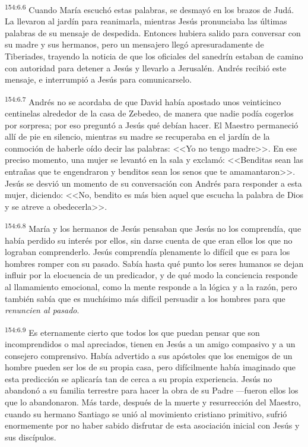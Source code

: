 \par 
\textsuperscript{154:6.6} Cuando María escuchó estas palabras, se desmayó en los brazos de Judá. La llevaron al jardín para reanimarla, mientras Jesús pronunciaba las últimas palabras de su mensaje de despedida. Entonces hubiera salido para conversar con su madre y sus hermanos, pero un mensajero llegó apresuradamente de Tiberiades, trayendo la noticia de que los oficiales del sanedrín estaban de camino con autoridad para detener a Jesús y llevarlo a Jerusalén. Andrés recibió este mensaje, e interrumpió a Jesús para comunicarselo.

\par 
\textsuperscript{154:6.7} Andrés no se acordaba de que David había apostado unos veinticinco centinelas alrededor de la casa de Zebedeo, de manera que nadie podía cogerlos por sorpresa; por eso preguntó a Jesús qué debían hacer. El Maestro permaneció allí de pie en silencio, mientras su madre se recuperaba en el jardín de la conmoción de haberle oído decir las palabras: <<Yo no tengo madre>>. En ese preciso momento, una mujer se levantó en la sala y exclamó: <<Benditas sean las entrañas que te engendraron y benditos sean los senos que te amamantaron>>. Jesús se desvió un momento de su conversación con Andrés para responder a esta mujer, diciendo: <<No, bendito es más bien aquel que escucha la palabra de Dios y se atreve a obedecerla>>.

\par 
\textsuperscript{154:6.8} María y los hermanos de Jesús pensaban que Jesús no los comprendía, que había perdido su interés por ellos, sin darse cuenta de que eran ellos los que no lograban comprenderlo. Jesús comprendía plenamente lo difícil que es para los hombres romper con su pasado. Sabía hasta qué punto los seres humanos se dejan influir por la elocuencia de un predicador, y de qué modo la conciencia responde al llamamiento emocional, como la mente responde a la lógica y a la razón, pero también sabía que es muchísimo más difícil persuadir a los hombres para que \textit{renuncien al pasado}.

\par 
\textsuperscript{154:6.9} Es eternamente cierto que todos los que puedan pensar que son incomprendidos o mal apreciados, tienen en Jesús a un amigo compasivo y a un consejero comprensivo. Había advertido a sus apóstoles que los enemigos de un hombre pueden ser los de su propia casa, pero difícilmente había imaginado que esta predicción se aplicaría tan de cerca a su propia experiencia. Jesús no abandonó a su familia terrestre para hacer la obra de su Padre ---fueron ellos los que lo abandonaron. Más tarde, después de la muerte y resurrección del Maestro, cuando su hermano Santiago se unió al movimiento cristiano primitivo, sufrió enormemente por no haber sabido disfrutar de esta asociación inicial con Jesús y sus discípulos.

